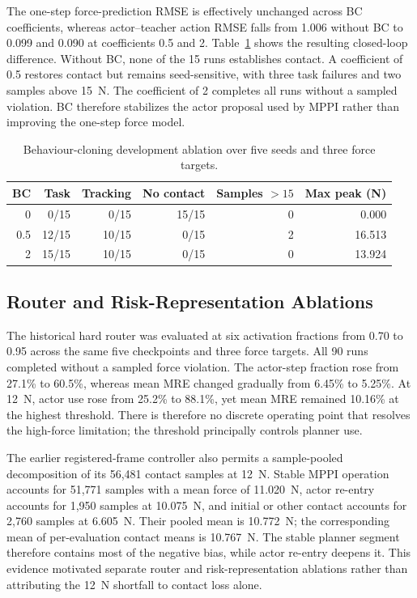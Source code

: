 The one-step force-prediction RMSE is effectively unchanged across BC
coefficients, whereas actor--teacher action RMSE falls from 1.006 without BC
to 0.099 and 0.090 at coefficients 0.5 and 2. Table~\ref{tab:bc_ablation_dev}
shows the resulting closed-loop difference. Without BC, none of the 15 runs
establishes contact. A coefficient of 0.5 restores contact but remains
seed-sensitive, with three task failures and two samples above 15~N. The
coefficient of 2 completes all runs without a sampled violation. BC therefore
stabilizes the actor proposal used by MPPI rather than improving the one-step
force model.

\begin{table}[t]
\centering
\caption{Behaviour-cloning development ablation over five seeds and three
force targets.}
\label{tab:bc_ablation_dev}
\small
\begin{tabular}{rrrrrr}
\toprule
BC & Task & Tracking & No contact & Samples $>15$ & Max peak (N) \\
\midrule
0   &  0/15 &  0/15 & 15/15 & 0 &  0.000 \\
0.5 & 12/15 & 10/15 &  0/15 & 2 & 16.513 \\
2   & 15/15 & 10/15 &  0/15 & 0 & 13.924 \\
\bottomrule
\end{tabular}
\end{table}

\subsection{Router and Risk-Representation Ablations}

The historical hard router was evaluated at six activation fractions from
0.70 to 0.95 across the same five checkpoints and three force targets. All
90 runs completed without a sampled force violation. The actor-step fraction
rose from 27.1\% to 60.5\%, whereas mean MRE changed gradually from 6.45\% to
5.25\%. At 12~N, actor use rose from 25.2\% to 88.1\%, yet mean MRE remained
10.16\% at the highest threshold. There is therefore no discrete operating
point that resolves the high-force limitation; the threshold principally
controls planner use.

The earlier registered-frame controller also permits a sample-pooled
decomposition of its 56,481 contact samples at 12~N. Stable MPPI operation
accounts for 51,771 samples with a mean force of 11.020~N, actor re-entry
accounts for 1,950 samples at 10.075~N, and initial or other contact accounts
for 2,760 samples at 6.605~N. Their pooled mean is 10.772~N; the corresponding
mean of per-evaluation contact means is 10.767~N. The stable planner segment
therefore contains most of the negative bias, while actor re-entry deepens it.
This evidence motivated separate router and risk-representation ablations
rather than attributing the 12~N shortfall to contact loss alone.

